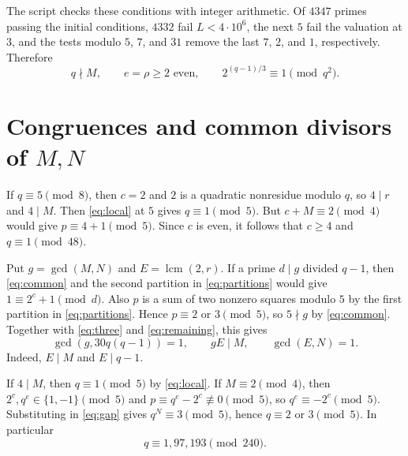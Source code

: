 \documentclass[11pt]{article}
\DeclareMathOperator{\lcm}{lcm}
\begin{document}
The script  checks these
conditions with integer arithmetic. Of $4347$ primes passing the
initial conditions, $4332$ fail $L<4\cdot10^6$, the next $5$ fail the
valuation at $3$, and the tests modulo $5$, $7$, and $31$ remove the
last $7$, $2$, and $1$, respectively. Therefore
\begin{equation}\label{eq:remaining}
q\nmid M,\qquad e=\rho\ge2\text{ even},\qquad
2^{(q-1)/3}\equiv1\pmod{q^2}.
\end{equation}

\section{Congruences and common divisors of \texorpdfstring{$M,N$}{M,N}}
\label{sec:gcd}

If $q\equiv5\pmod8$, then $c=2$ and $2$ is a quadratic nonresidue
modulo $q$, so $4\mid r$ and $4\mid M$. Then \eqref{eq:local} at $5$
gives $q\equiv1\pmod5$. But $c+M\equiv2\pmod4$ would give
$p\equiv4+1\pmod5$. Since $c$ is even, it follows that $c\ge4$ and
$q\equiv1\pmod{48}$.

Put $g=\gcd(M,N)$ and $E=\lcm(2,r)$. If a prime $d\mid g$ divided
$q-1$, then \eqref{eq:common} and the second partition in
\eqref{eq:partitions} would give $1\equiv2^c+1\pmod d$.
Also $p$ is a sum of two nonzero squares modulo $5$ by the first
partition in \eqref{eq:partitions}. Hence $p\equiv2$ or
$3\pmod5$, so $5\nmid g$ by \eqref{eq:common}.
Together with \eqref{eq:three} and \eqref{eq:remaining}, this gives
\begin{equation}\label{eq:gcd}
\gcd(g,30q(q-1))=1,\qquad gE\mid M,\qquad \gcd(E,N)=1.
\end{equation}
Indeed, $E\mid M$ and $E\mid q-1$.

If $4\mid M$, then $q\equiv1\pmod5$ by \eqref{eq:local}.
If $M\equiv2\pmod4$, then $2^c,q^e\in\{1,-1\}\pmod5$ and
$p\equiv q^e-2^c\not\equiv0\pmod5$, so $q^e\equiv-2^c\pmod5$.
Substituting in \eqref{eq:gap} gives $q^N\equiv3\pmod5$, hence
$q\equiv2$ or $3\pmod5$. In particular
\begin{equation}\label{eq:240}
q\equiv1,97,193\pmod{240}.
\end{equation}
\end{document}
